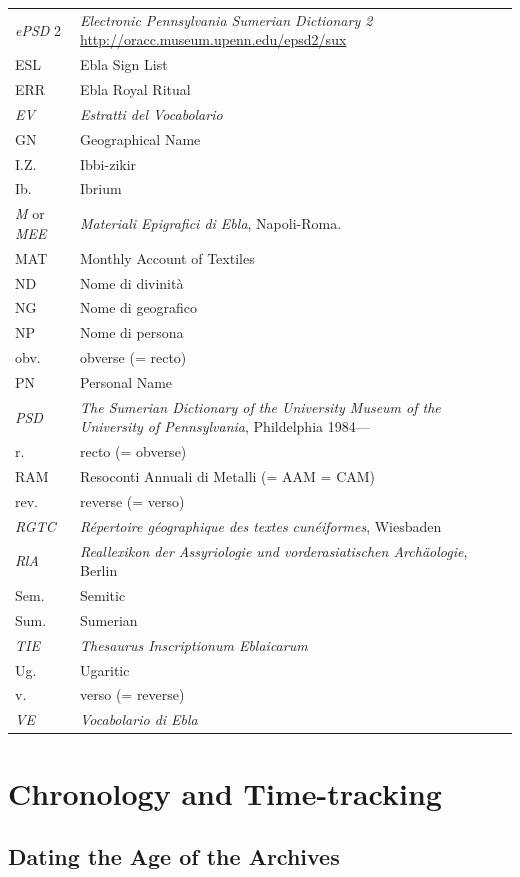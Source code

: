 \documentclass[
]{book}
\begin{document}
\begin{longtable}[]{@{}
  >{\raggedright\arraybackslash}p{}
  >{\raggedright\arraybackslash}p{}@{}}
\emph{ePSD} 2 & \emph{Electronic Pennsylvania Sumerian Dictionary 2} \url{http://oracc.museum.upenn.edu/epsd2/sux} \\
ESL & Ebla Sign List \\
ERR & Ebla Royal Ritual \\
\emph{EV} & \emph{Estratti del Vocabolario} \\
GN & Geographical Name \\
I.Z. & Ibbi-zikir \\
Ib. & Ibrium \\
\emph{M} or \emph{MEE} & \emph{Materiali Epigrafici di Ebla}, Napoli-Roma. \\
MAT & Monthly Account of Textiles \\
ND & Nome di divinità \\
NG & Nome di geografico \\
NP & Nome di persona \\
obv. & obverse (= recto) \\
PN & Personal Name \\
\emph{PSD} & \emph{The Sumerian Dictionary of the University Museum of the University of Pennsylvania}, Phildelphia 1984--- \\
r. & recto (= obverse) \\
RAM & Resoconti Annuali di Metalli (= AAM = CAM) \\
rev. & reverse (= verso) \\
\emph{RGTC} & \emph{Répertoire géographique des textes cunéiformes}, Wiesbaden \\
\emph{RlA} & \emph{Reallexikon der Assyriologie und vorderasiatischen Archäologie}, Berlin \\
Sem. & Semitic \\
Sum. & Sumerian \\
\emph{TIE} & \emph{Thesaurus Inscriptionum Eblaicarum} \\
Ug. & Ugaritic \\
v. & verso (= reverse) \\
\emph{VE} & \emph{Vocabolario di Ebla} \\
\end{longtable}

\hypertarget{chronology-and-time-tracking}{%
\chapter{Chronology and Time-tracking}\label{chronology-and-time-tracking}}

\hypertarget{dating-the-age-of-the-archives}{%
\section{Dating the Age of the Archives}\label{dating-the-age-of-the-archives}}
\end{document}
